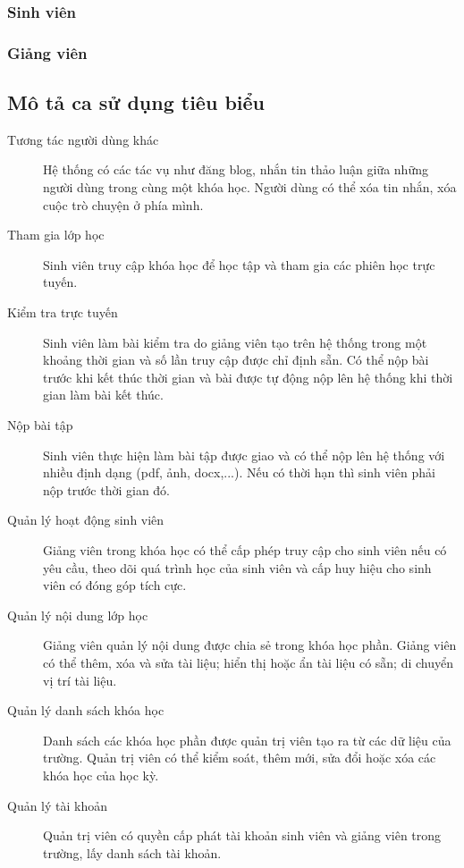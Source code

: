 \documentclass[./../main_file.tex]{subfiles}
\begin{document}
	\subsubsection{Sinh viên}
	\subsubsection{Giảng viên}
	\subsection{Mô tả ca sử dụng tiêu biểu}
	\begin{description}
		\item[Tương tác người dùng khác] Hệ thống có các tác vụ như đăng blog, nhắn tin thảo luận giữa những người dùng trong cùng một khóa học. Người dùng có thể xóa tin nhắn, xóa cuộc trò chuyện ở phía mình.
		\item[Tham gia lớp học] Sinh viên truy cập khóa học để học tập và tham gia các phiên học trực tuyến.
		\item[Kiểm tra trực tuyến] Sinh viên làm bài kiểm tra do giảng viên tạo trên hệ thống trong một khoảng thời gian và số lần truy cập được chỉ định sẵn. Có thể nộp bài trước khi kết thúc thời gian và bài được tự động nộp lên hệ thống khi thời gian làm bài kết thúc.
		\item[Nộp bài tập] Sinh viên thực hiện làm bài tập được giao và có thể nộp lên hệ thống với nhiều định dạng (pdf, ảnh, docx,...). Nếu có thời hạn thì sinh viên phải nộp trước thời gian đó.
		\item[Quản lý hoạt động sinh viên] Giảng viên trong khóa học có thể cấp phép truy cập cho sinh viên nếu có yêu cầu, theo dõi quá trình học của sinh viên và cấp huy hiệu cho sinh viên có đóng góp tích cực.
		\item[Quản lý nội dung lớp học] Giảng viên quản lý nội dung được chia sẻ trong khóa học phần. Giảng viên có thể thêm, xóa và sửa tài liệu; hiển thị hoặc ẩn tài liệu có sẵn; di chuyển vị trí tài liệu.
		\item[Quản lý danh sách khóa học] Danh sách các khóa học phần được quản trị viên tạo ra từ các dữ liệu của trường. Quản trị viên có thể kiểm soát, thêm mới, sửa đổi hoặc xóa các khóa học của học kỳ.
		\item[Quản lý tài khoản] Quản trị viên có quyền cấp phát tài khoản sinh viên và giảng viên trong trường, lấy danh sách tài khoản.
		
	\end{description}
\end{document}
